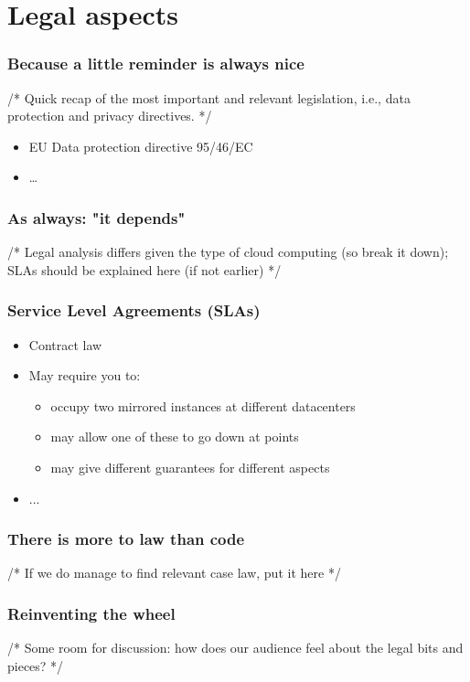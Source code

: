 \documentclass{beamer}
\begin{document}
\section{Legal aspects}

\begin{frame}
    \frametitle{Because a little reminder is always nice}
    /* Quick recap of the most important and relevant legislation, i.e., data
    protection and privacy directives. */
    \begin{itemize}	
    \item EU Data protection directive 95/46/EC
    \item \dots
    \end{itemize}
\end{frame}

\begin{frame}
    \frametitle{As always: "it depends"}
    /* Legal analysis differs given the type of cloud computing (so break it
    down); SLAs should be explained here (if not earlier) */
\end{frame}

\begin{frame}
    \frametitle{Service Level Agreements (SLAs)}
    \begin{itemize}
    \item Contract law
    \item May require you to:
      \begin{itemize} %
        \item occupy two mirrored instances at different datacenters
        \item may allow one of these to go down at points
        \item may give different guarantees for different aspects
      \end{itemize}
    \item ...
    \end{itemize}
\end{frame}

\begin{frame}
    \frametitle{There is more to law than code}
    /* If we do manage to find relevant case law, put it here */
\end{frame}

\begin{frame}
    \frametitle{Reinventing the wheel}
    /* Some room for discussion: how does our audience feel about the legal
    bits and pieces? */
\end{frame}
\end{document}
